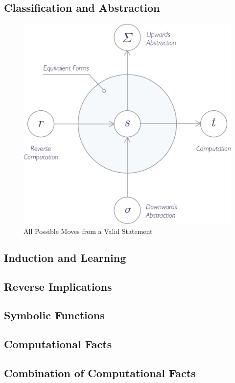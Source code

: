\subsection{Classification and Abstraction}
\begin{figure}
  \includegraphics[width=\linewidth]{img/moves.png}
  \caption{All Possible Moves from a Valid Statement}
  \label{fig:moves}
\end{figure}

\subsection{Induction and Learning}
\subsection{Reverse Implications}
\subsection{Symbolic Functions}
\subsection{Computational Facts}
\subsection{Combination of Computational Facts}
